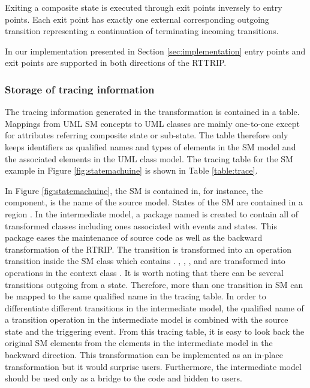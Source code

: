 Exiting a composite state is executed through exit points inversely to entry points. Each exit point has exactly one external corresponding outgoing transition representing a continuation of terminating incoming transitions.

In our implementation presented in Section \ref{sec:implementation} entry points and exit points are supported in both directions of the RTTRIP. 

\subsubsection{Storage of tracing information}
\label{subsec:trace}
The tracing information generated in the transformation is contained in a table. Mappings from UML SM concepts to UML classes are mainly one-to-one except for attributes referring composite state or sub-state. The table therefore only keeps identifiers as qualified names and types of elements in the SM model and the associated elements in the UML class model. The tracing table for the SM example in Figure \ref{fig:statemachuine} is shown in Table \ref{table:trace}.

In Figure \ref{fig:statemachuine}, the SM is contained in, for instance, the  component,  is the name of the source model. States of the SM are contained in a region . In the intermediate model, a package named  is created to contain all of transformed classes including ones associated with events and states. This package eases the maintenance of source code as well as the backward transformation of the RTRIP. The transition  is transformed into an operation transition inside the SM class which contains . , , , and  are transformed into operations in the context class . It is worth noting that there can be several transitions outgoing from a state. Therefore, more than one transition in SM can be mapped to the same qualified name in the tracing table. In order to differentiate different transitions in the intermediate model, the qualified name of a transition operation in the intermediate model is combined with the source state and the triggering event. From this tracing table, it is easy to look back the original SM elements from the elements in the intermediate model in the backward direction. This transformation can be implemented as an in-place transformation but it would surprise users. Furthermore, the intermediate model should be used only as a bridge to the code and hidden to users. 

